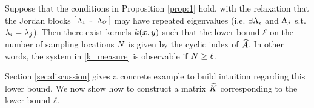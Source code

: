 \begin{proposition}\label{prop:2}
 Suppose that the conditions in Proposition \ref{prop:1} hold, with the relaxation that
 the Jordan blocks $\left[\begin{smallmatrix}
                           \Lambda_1 &\cdots & \Lambda_{O}
                          \end{smallmatrix}\right]$ may have 
 repeated eigenvalues (i.e. $\exists \Lambda_i$ and $\Lambda_j$ s.t. $\lambda_i = \lambda_j$). 
 Then there exist kernels $k(x,y)$ such that 
 the lower bound $\ell$ on the number of sampling locations $N$ is given by the cyclic index of $\widehat{A}$. In other words, the system in \eqref{k_measure} is observable if $ N \geq \ell$.
\end{proposition}
Section \ref{sec:discussion} gives a concrete example to build intuition regarding this lower bound. We now show how to construct a matrix $\widetilde{K}$ corresponding to the lower bound $\ell$.
